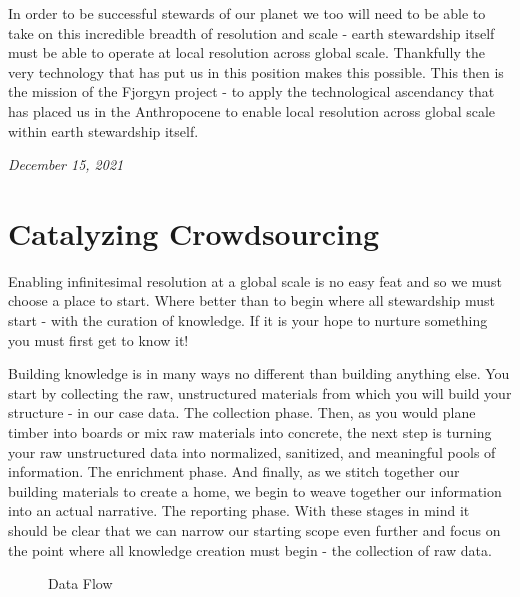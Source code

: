 \documentclass[10pt,a5paper]{book}
\begin{document}
In order to be successful stewards of our planet we too will need to be able to take on this incredible breadth of resolution and scale - earth stewardship itself must be able to operate at local resolution across global scale. Thankfully the very technology that has put us in this position makes this possible. This then is the mission of the Fjorgyn project - to apply the technological ascendancy that has placed us in the Anthropocene to enable local resolution across global scale within earth stewardship itself.

\textit{December 15, 2021}

\section{Catalyzing Crowdsourcing}

Enabling infinitesimal resolution at a global scale is no easy feat and so we must choose a place to start. Where better than to begin where all stewardship must start - with the curation of knowledge. If it is your hope to nurture something you must first get to know it!

Building knowledge is in many ways no different than building anything else. You start by collecting the raw, unstructured materials from which you will build your structure - in our case data. The collection phase. Then, as you would plane timber into boards or mix raw materials into concrete, the next step is turning your raw unstructured data into normalized, sanitized, and meaningful pools of information. The enrichment phase. And finally, as we stitch together our building materials to create a home, we begin to weave together our information into an actual narrative. The reporting phase. With these stages in mind it should be clear that we can narrow our starting scope even further and focus on the point where all knowledge creation must begin - the collection of raw data.


\begin{figure}[!htb]
\caption{\label{fig:my-label} Data Flow}
\end{figure}
\end{document}
